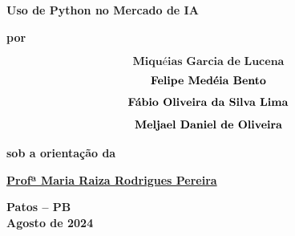 \begin{center}

\begin{singlespace}
{\large{\textbf{}}}

{\large{\textbf{}}}

{\large{\textbf{}}}

{\large{\textbf{}}}
\end{singlespace}

\vspace{4.0cm}

\textbf{\huge{{ Uso de Python no Mercado de IA }}}

\vspace{1cm}

\textbf{por}

\vspace {1cm}

{\large{$$\textbf { Miquéias Garcia de Lucena }$$$$\newline\textbf {Felipe Medéia Bento}$$$$\newline\textbf {Fábio Oliveira da Silva Lima}$$$$\newline\textbf {Meljael Daniel de Oliveira}$$}}

\vspace{1cm}

\textbf{sob a orientação da}

\vspace{1cm}

\href{ }
{\centering \large{\textbf{ Profª Maria Raiza Rodrigues Pereira }}}

\vspace{4cm}

\begin{singlespace}

\large{\textbf{Patos -- PB}}\\
\large{\textbf{Agosto de 2024}}

\end{singlespace}

\end{center}

\pagebreak

\thispagestyle{empty}

\vspace{1.5cm}

\thispagestyle{empty}

\mbox{}

\vspace{15cm}




